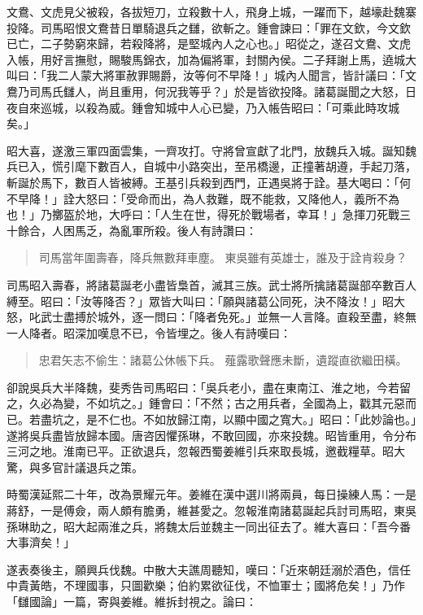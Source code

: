 文鴦、文虎見父被殺，各拔短刀，立殺數十人，飛身上城，一躍而下，越壕赴魏寨投降。司馬昭恨文鴦昔日單騎退兵之讎，欲斬之。鍾會諫曰：「罪在文欽，今文欽已亡，二子勢窮來歸，若殺降將，是堅城內人之心也。」昭從之，遂召文鴦、文虎入帳，用好言撫慰，賜駿馬錦衣，加為偏將軍，封關內侯。二子拜謝上馬，遶城大叫曰：「我二人蒙大將軍赦罪賜爵，汝等何不早降！」城內人聞言，皆計議曰：「文鴦乃司馬氏讎人，尚且重用，何況我等乎？」於是皆欲投降。諸葛誕聞之大怒，日夜自來巡城，以殺為威。鍾會知城中人心已變，乃入帳告昭曰：「可乘此時攻城矣。」

昭大喜，遂激三軍四面雲集，一齊攻打。守將曾宣獻了北門，放魏兵入城。誕知魏兵已入，慌引麾下數百人，自城中小路突出，至吊橋邊，正撞著胡遵，手起刀落，斬誕於馬下，數百人皆被縛。王基引兵殺到西門，正遇吳將于詮。基大喝曰：「何不早降！」詮大怒曰：「受命而出，為人救難，既不能救，又降他人，義所不為也！」乃擲盔於地，大呼曰：「人生在世，得死於戰場者，幸耳！」急揮刀死戰三十餘合，人困馬乏，為亂軍所殺。後人有詩讚曰：

\begin{quote}
司馬當年圍壽春，降兵無數拜車塵。
東吳雖有英雄士，誰及于詮肯殺身？
\end{quote}

司馬昭入壽春，將諸葛誕老小盡皆梟首，滅其三族。武士將所擒諸葛誕部卒數百人縛至。昭曰：「汝等降否？」眾皆大叫曰：「願與諸葛公同死，決不降汝！」昭大怒，叱武士盡搏於城外，逐一問曰：「降者免死。」並無一人言降。直殺至盡，終無一人降者。昭深加嘆息不已，令皆埋之。後人有詩嘆曰：

\begin{quote}
忠君矢志不偷生：諸葛公休帳下兵。
薤露歌聲應未斷，遺蹤直欲繼田橫。
\end{quote}

卻說吳兵大半降魏，斐秀告司馬昭曰：「吳兵老小，盡在東南江、淮之地，今若留之，久必為變，不如坑之。」鍾會曰：「不然；古之用兵者，全國為上，戳其元惡而已。若盡坑之，是不仁也。不如放歸江南，以顯中國之寬大。」昭曰：「此妙論也。」遂將吳兵盡皆放歸本國。唐咨因懼孫琳，不敢回國，亦來投魏。昭皆重用，令分布三河之地。淮南已平。正欲退兵，忽報西蜀姜維引兵來取長城，邀截糧草。昭大驚，與多官計議退兵之策。

時蜀漢延熙二十年，改為景耀元年。姜維在漢中選川將兩員，每日操練人馬：一是蔣舒，一是傅僉，兩人頗有膽勇，維甚愛之。忽報淮南諸葛誕起兵討司馬昭，東吳孫琳助之，昭大起兩淮之兵，將魏太后並魏主一同出征去了。維大喜曰：「吾今番大事濟矣！」

遂表奏後主，願興兵伐魏。中散大夫譙周聽知，嘆曰：「近來朝廷溺於酒色，信任中貴黃皓，不理國事，只圖歡樂；伯約累欲征伐，不恤軍士；國將危矣！」乃作「讎國論」一篇，寄與姜維。維拆封視之。論曰：

